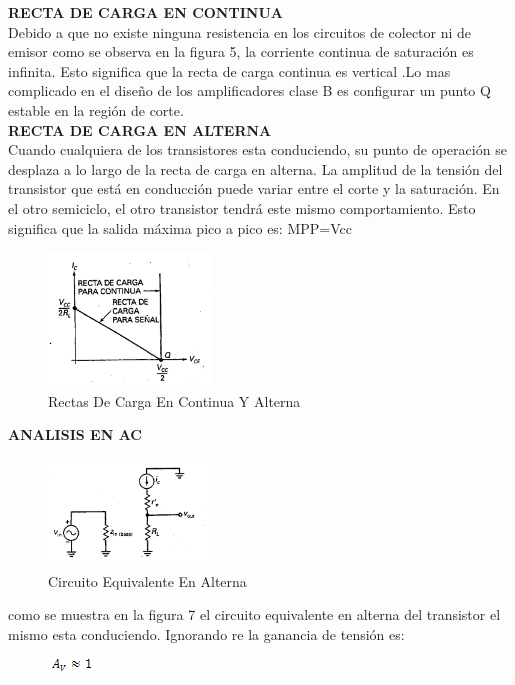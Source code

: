 \documentclass[10pt,a4paper]{article}
\begin{document}
\textbf{RECTA DE CARGA EN CONTINUA}\\
Debido a que no existe ninguna resistencia en los circuitos de colector ni de emisor como se observa en la figura 5, la corriente continua de saturación es infinita. Esto significa que la recta de carga continua es vertical .Lo mas complicado en el diseño de los amplificadores clase B es configurar un punto Q estable en la región de corte.\\
\textbf{RECTA DE CARGA EN ALTERNA}\\
Cuando cualquiera de los transistores esta conduciendo, su punto de operación se desplaza a lo largo de la recta de carga en alterna. La amplitud de la tensión del transistor que está en conducción puede variar entre el corte y la saturación. En el otro semiciclo, el otro transistor tendrá este mismo comportamiento. Esto significa que la salida máxima pico a pico es:  MPP=Vcc\\
\begin{center}
\begin{figure}[hbtp]
\centering
\includegraphics[scale=0.5]{7.png}
\caption{Rectas De Carga En Continua Y Alterna}
\end{figure}
\end{center}

\newpage
\textbf{ ANALISIS EN AC}\\
\begin{center}
\begin{figure}[hbtp]
\centering
\includegraphics[scale=0.5]{8.png}
\caption{ Circuito Equivalente En Alterna}
\end{figure}
\end{center}
como se muestra en la figura 7 el circuito equivalente en alterna del transistor el mismo esta conduciendo. Ignorando re la ganancia de tensión es:\\
\begin{center}
\begin{figure}[hbtp]
\centering
\includegraphics[scale=0.5]{9.png}
\end{figure}
\end{center}
\end{document}
